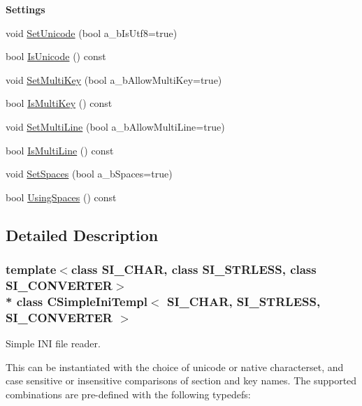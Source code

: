\begin{Indent}{\bf Settings}\par
\begin{DoxyCompactItemize}
\item 
void \hyperlink{classCSimpleIniTempl_aa9a15a66de893571014f661f89cb4d4b}{Set\+Unicode} (bool a\+\_\+b\+Is\+Utf8=true)
\item 
bool \hyperlink{classCSimpleIniTempl_aa18f29d67107392a9e9f361def892c71}{Is\+Unicode} () const 
\item 
void \hyperlink{classCSimpleIniTempl_ac3cfaf072a64f960bdcb7ddf2edc52b6}{Set\+Multi\+Key} (bool a\+\_\+b\+Allow\+Multi\+Key=true)
\item 
bool \hyperlink{classCSimpleIniTempl_a8069b3c574949b78fe0274ae803f0685}{Is\+Multi\+Key} () const 
\item 
void \hyperlink{classCSimpleIniTempl_aa7214b76600790053a5c715e9730aab0}{Set\+Multi\+Line} (bool a\+\_\+b\+Allow\+Multi\+Line=true)
\item 
bool \hyperlink{classCSimpleIniTempl_a805dba3689efd63f8c4485a5f2e89090}{Is\+Multi\+Line} () const 
\item 
void \hyperlink{classCSimpleIniTempl_ae3c0eae2dcd84a42c99bb86ae103662c}{Set\+Spaces} (bool a\+\_\+b\+Spaces=true)
\item 
bool \hyperlink{classCSimpleIniTempl_a9c967faf796cf5babea67e97975bed9b}{Using\+Spaces} () const 
\end{DoxyCompactItemize}
\end{Indent}


\subsection{Detailed Description}
\subsubsection*{template$<$class S\+I\+\_\+\+C\+H\+AR, class S\+I\+\_\+\+S\+T\+R\+L\+E\+SS, class S\+I\+\_\+\+C\+O\+N\+V\+E\+R\+T\+ER$>$\\*
class C\+Simple\+Ini\+Templ$<$ S\+I\+\_\+\+C\+H\+A\+R, S\+I\+\_\+\+S\+T\+R\+L\+E\+S\+S, S\+I\+\_\+\+C\+O\+N\+V\+E\+R\+T\+E\+R $>$}

Simple I\+NI file reader.

This can be instantiated with the choice of unicode or native characterset, and case sensitive or insensitive comparisons of section and key names. The supported combinations are pre-\/defined with the following typedefs\+:

